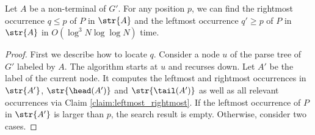 \begin{lemma}\label{lm:predecessor}
Let $A$ be a non-terminal of $G'$. For any position $p$, we can find the rightmost occurrence $q \le p$ of $P$ in $\str{A}$ and the leftmost occurrence $q'\geq p$ of $P$ in $\str{A}$ in $O(\log^{3} N\log \log N)$ time.  
\end{lemma}
\begin{proof}
First we describe how to locate $q$. Consider a node $u$ of the parse tree of $G'$ labeled by $A$. The algorithm starts at $u$ and recurses down. Let $A'$ be the label of the current node. It computes the leftmost and rightmost occurrences in $\str{A'}$, $\str{\head(A')}$ and $\str{\tail(A')}$ as well as all relevant occurrences via Claim \ref{claim:leftmost_rightmost}. If the leftmost occurrence of $P$ in $\str{A'}$ is larger than $p$, the search result is empty. Otherwise, consider two cases. 


\end{proof}
